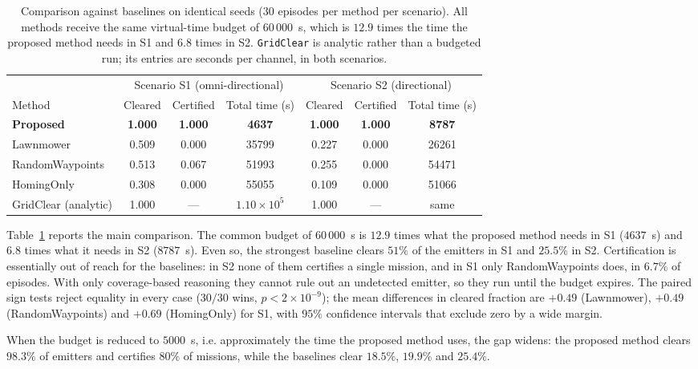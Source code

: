\documentclass[preprint,12pt,3p]{elsarticle}
\theoremstyle{definition}
\begin{document}
\begin{table}[t]
\caption{Comparison against baselines on identical seeds ($30$ episodes per method per
scenario). All methods receive the same virtual-time budget of $60\,000$~s, which is $12.9$ times
the time the proposed method needs in S1 and $6.8$ times in S2. \texttt{GridClear} is analytic
rather than a budgeted run; its entries are seconds per channel, in both scenarios.}
\label{tab:main}
\centering
\small
\setlength{\tabcolsep}{5pt}
\begin{tabular}{lcccccc}
\toprule
& \multicolumn{3}{c}{Scenario S1 (omni-directional)} & \multicolumn{3}{c}{Scenario S2 (directional)} \\
\cmidrule(lr){2-4}\cmidrule(lr){5-7}
Method & Cleared & Certified & Total time (s) & Cleared & Certified & Total time (s) \\
\midrule
\textbf{Proposed}   & \textbf{1.000} & \textbf{1.000} & \textbf{4637} & \textbf{1.000} & \textbf{1.000} & \textbf{8787} \\
Lawnmower           & 0.509 & 0.000 & 35799 & 0.227 & 0.000 & 26261 \\
RandomWaypoints     & 0.513 & 0.067 & 51993 & 0.255 & 0.000 & 54471 \\
HomingOnly          & 0.308 & 0.000 & 55055 & 0.109 & 0.000 & 51066 \\
\midrule
GridClear (analytic) & 1.000 & --- & $1.10\times10^5$ & 1.000 & --- & same \\
\bottomrule
\end{tabular}
\end{table}

Table~\ref{tab:main} reports the main comparison. The common budget of $60\,000$~s is $12.9$
times what the proposed method needs in S1 ($4637$~s) and $6.8$ times what it needs in S2
($8787$~s). Even so, the strongest baseline clears $51\%$ of the emitters in S1 and $25.5\%$ in S2.
Certification is essentially out of reach for the baselines: in S2 none of them certifies a single
mission, and in S1 only RandomWaypoints does, in $6.7\%$ of episodes. With only coverage-based
reasoning they cannot rule out an undetected emitter, so they run until the budget expires. The paired sign tests
reject equality in every case ($30/30$ wins, $p<2\times10^{-9}$); the mean differences in cleared
fraction are $+0.49$ (Lawnmower), $+0.49$ (RandomWaypoints) and $+0.69$ (HomingOnly) for S1, with
$95\%$ confidence intervals that exclude zero by a wide margin.

When the budget is reduced to $5000$~s, i.e. approximately the time the proposed method uses, the
gap widens: the proposed method clears $98.3\%$ of emitters and certifies $80\%$ of missions, while
the baselines clear $18.5\%$, $19.9\%$ and $25.4\%$.
\end{document}

